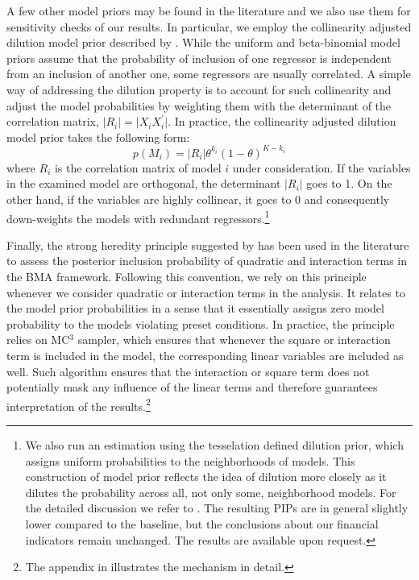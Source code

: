 \begin{refsection}
A few other model priors may be found in the literature and we also use them for sensitivity checks of our results. In particular, we employ the collinearity adjusted dilution model prior described by \textcite{george2010}. While the uniform and beta-binomial model priors assume that the probability of inclusion of one regressor is independent from an inclusion of another one, some regressors are usually correlated. A simple way of addressing the dilution property is to account for such collinearity and adjust the model probabilities by weighting them with the determinant of the correlation matrix, $\vert R_{i} \vert = \vert X_{i}^{}X_{i}^{\prime} \vert$. In practice, the collinearity adjusted dilution model prior takes the following form:
\begin{equation}
	p(M_{i})=\vert R_{i} \vert \theta^{k_{i}}(1-\theta)^{K-k_{i}}
\end{equation}
where $R_{i}$ is the correlation matrix of model $i$ under consideration. If the variables in the examined model are orthogonal, the determinant $\vert R_{i} \vert$ goes to 1. On the other hand, if the variables are highly collinear, it goes to 0 and consequently down-weights the models with redundant regressors.\footnote{We also run an estimation using the tesselation defined dilution prior, which assigns uniform probabilities to the neighborhoods of models. This construction of model prior reflects the idea of dilution more closely as it dilutes the probability across all, not only some, neighborhood models. For the detailed discussion we refer to \textcite{george2010}. The resulting \acp{PIP} are in general slightly lower compared to the baseline, but the conclusions about our financial indicators remain unchanged. The results are available upon request.}

Finally, the strong heredity principle suggested by \textcite{chipman1996} has been used in the literature to assess the posterior inclusion probability of quadratic and interaction terms in the \ac{BMA} framework. Following this convention, we rely on this principle whenever we consider quadratic or interaction terms in the analysis. It relates to the model prior probabilities in a sense that it essentially assigns zero model probability to the models violating preset conditions. In practice, the principle relies on MC$^{3}$ sampler, which ensures that whenever the square or interaction term is included in the model, the corresponding linear variables are included as well. Such algorithm ensures that the interaction or square term does not potentially mask any influence of the linear terms and therefore guarantees interpretation of the results.\footnote{The appendix in \textcite{cuaresmaetal2014} illustrates the mechanism in detail.}


\end{refsection}
